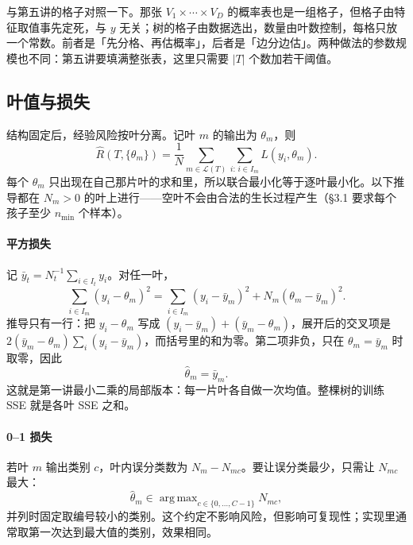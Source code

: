 \documentclass[11pt,a4paper,fontset=windows,zihao=-4]{ctexart}
\DeclareMathOperator*{\argmax}{arg\,max}
\newcommand{\Lcal}{\mathcal{L}}
\begin{document}
与第五讲的格子对照一下。那张 $V_1\times\cdots\times V_D$ 的概率表也是一组格子，但格子由特征取值事先定死，与 $y$ 无关；树的格子由数据选出，数量由叶数控制，每格只放一个常数。前者是「先分格、再估概率」，后者是「边分边估」。两种做法的参数规模也不同：第五讲要填满整张表，这里只需要 $\lvert T\rvert$ 个数加若干阈值。

\subsection{叶值与损失}

结构固定后，经验风险按叶分离。记叶 $m$ 的输出为 $\theta_m$，则
\begin{equation}
  \widehat R(T,\{\theta_m\})
  =\frac1N\sum_{m\in\Lcal(T)}\sum_{i:\,i\in I_m}L(y_i,\theta_m).
  \label{eq:risk}
\end{equation}
每个 $\theta_m$ 只出现在自己那片叶的求和里，所以联合最小化等于逐叶最小化。以下推导都在 $N_m>0$ 的叶上进行——空叶不会由合法的生长过程产生（§3.1 要求每个孩子至少 $n_{\min}$ 个样本）。

\paragraph{平方损失} 记 $\bar y_t=N_t^{-1}\sum_{i\in I_t}y_i$。对任一叶，
\begin{equation}
  \sum_{i\in I_m}(y_i-\theta_m)^2
  =\sum_{i\in I_m}(y_i-\bar y_m)^2+N_m(\theta_m-\bar y_m)^2 .
  \label{eq:sqsplit}
\end{equation}
推导只有一行：把 $y_i-\theta_m$ 写成 $(y_i-\bar y_m)+(\bar y_m-\theta_m)$，展开后的交叉项是 $2(\bar y_m-\theta_m)\sum_i(y_i-\bar y_m)$，而括号里的和为零。第二项非负，只在 $\theta_m=\bar y_m$ 时取零，因此
\begin{equation}
  \widehat\theta_m=\bar y_m .
  \label{eq:leafmean}
\end{equation}
这就是第一讲最小二乘的局部版本：每一片叶各自做一次均值。整棵树的训练 SSE 就是各叶 SSE 之和。

\paragraph{0--1 损失} 若叶 $m$ 输出类别 $c$，叶内误分类数为 $N_m-N_{mc}$。要让误分类最少，只需让 $N_{mc}$ 最大：
\begin{equation}
  \widehat\theta_m\in\argmax_{c\in\{0,\dots,C-1\}}N_{mc},
  \label{eq:leafmode}
\end{equation}
并列时固定取编号较小的类别。这个约定不影响风险，但影响可复现性；实现里通常取第一次达到最大值的类别，效果相同。
\end{document}
